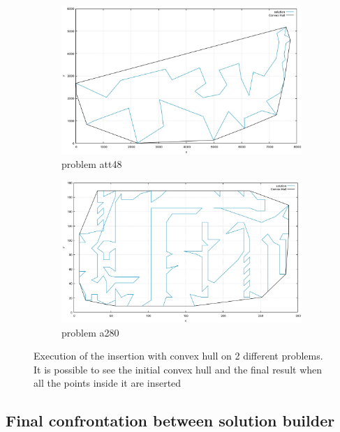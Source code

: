 \begin{figure}[h!]
  \centering
  \begin{subfigure}[b]{0.5\linewidth}
    \includegraphics[width=\linewidth]{media/convex1.jpg}
     \caption{problem att48}
  \end{subfigure}
  \begin{subfigure}[b]{0.5\linewidth}
    \includegraphics[width=\linewidth]{media/convex2.jpg}
    \caption{problem a280}
  \end{subfigure}
  \caption{Execution of the insertion with convex hull on 2 different problems. It is possible to see the initial convex hull and the final result when all the points inside it are inserted}
\end{figure}

\subsection{Final confrontation between solution builder}

